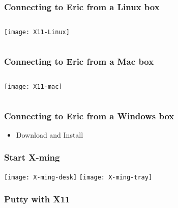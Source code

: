 \documentclass[slidestop,mathserif,compress,xcolor=svgnames,table]{beamer}
\begin{document}
\begin{frame}
  \frametitle{\small Connecting to Eric from a Linux box}
  \vspace{-0.5cm}
  \begin{columns}
    \column{12cm}
    \begin{center}
      \texttt{[image: X11-Linux]}
    \end{center}
  \end{columns}
\end{frame}

\begin{frame}
  \frametitle{\small Connecting to Eric from a Mac box}
  \vspace{-0.5cm}
  \begin{columns}
    \column{12cm}
    \begin{center}
      \texttt{[image: X11-mac]}
    \end{center}
  \end{columns}
\end{frame}

\begin{frame}
  \frametitle{\small Connecting to Eric from a Windows box}
  \begin{itemize}
    \item Download and Install
  \end{itemize}
\end{frame}

\begin{frame}
  \frametitle{\small Start X-ming}
  \begin{center}
    \texttt{[image: X-ming-desk]}
    \texttt{[image: X-ming-tray]}
    \end{center}
\end{frame}

\begin{frame}
  \frametitle{\small Putty with X11}
  \begin{center}
  \end{center}
\end{frame}
\end{document}
